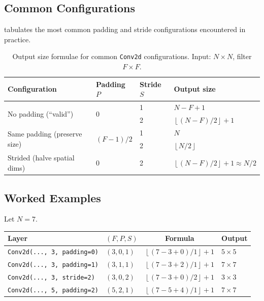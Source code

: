 \documentclass[12pt,a4paper]{article}
\newcommand{\floor}[1]{\left\lfloor #1 \right\rfloor}
\begin{document}
\subsection{Common Configurations}

 tabulates the most common padding and stride
configurations encountered in practice.

\begin{table}[ht]
  \centering
  \caption{Output size formulae for common \texttt{Conv2d} configurations.
    Input: $N \times N$, filter $F \times F$.}
  \label{tab:output_size_configs}
  \begin{tabular}{@{}llll@{}}
    \toprule
    Configuration & Padding $P$ & Stride $S$ & Output size \\
    \midrule
    \multirow{2}{*}{No padding (``valid'')}
      & \multirow{2}{*}{0} & 1 & $N - F + 1$ \\
      &                    & 2 & $\floor{(N-F)/2}+1$ \\[4pt]
    \multirow{2}{*}{Same padding (preserve size)}
      & \multirow{2}{*}{$(F-1)/2$} & 1 & $N$ \\
      &                            & 2 & $\floor{N/2}$ \\[4pt]
    Strided (halve spatial dims) & 0 & 2 & $\floor{(N-F)/2}+1 \approx N/2$ \\
    \bottomrule
  \end{tabular}
\end{table}

\subsection{Worked Examples}

\begin{example}[title=Output sizes for a $7 \times 7$ input]
Let $N = 7$.

\medskip
\begin{tabular}{@{}llcl@{}}
  \toprule
  Layer & $(F, P, S)$ & Formula & Output \\
  \midrule
  \texttt{Conv2d(..., 3, padding=0)} & $(3,0,1)$
    & $\floor{(7-3+0)/1}+1$ & $5 \times 5$ \\
  \texttt{Conv2d(..., 3, padding=1)} & $(3,1,1)$
    & $\floor{(7-3+2)/1}+1$ & $7 \times 7$ \\
  \texttt{Conv2d(..., 3, stride=2)}  & $(3,0,2)$
    & $\floor{(7-3+0)/2}+1$ & $3 \times 3$ \\
  \texttt{Conv2d(..., 5, padding=2)} & $(5,2,1)$
    & $\floor{(7-5+4)/1}+1$ & $7 \times 7$ \\
  \bottomrule
\end{tabular}
\end{example}
\end{document}
